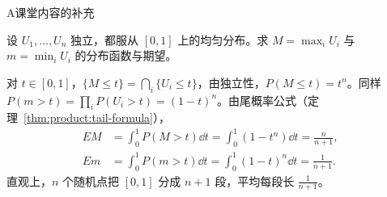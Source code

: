 \begin{exercises}{A}{课堂内容的补充}
\item\label{ex:independence:A10} 设 $U_1,\dots,U_n$ 独立，都服从 $[0,1]$ 上的均匀分布。求 $M=\max_iU_i$ 与 $m=\min_iU_i$ 的分布函数与期望。
\begin{solution}
对 $t\in[0,1]$，$\{M\leqslant t\}=\bigcap_i\{U_i\leqslant t\}$，由独立性，$P(M\leqslant t)=t^n$。同样 $P(m>t)=\prod_iP(U_i>t)=(1-t)^n$。由尾概率公式（定理~\ref{thm:product:tail-formula}），
\[
\begin{aligned}
EM&=\int_0^1P(M>t)\dd t=\int_0^1(1-t^n)\dd t=\frac n{n+1},\\
Em&=\int_0^1P(m>t)\dd t=\int_0^1(1-t)^n\dd t=\frac1{n+1}.
\end{aligned}
\]
直观上，$n$ 个随机点把 $[0,1]$ 分成 $n+1$ 段，平均每段长 $\frac1{n+1}$。
\end{solution}
\end{exercises}

